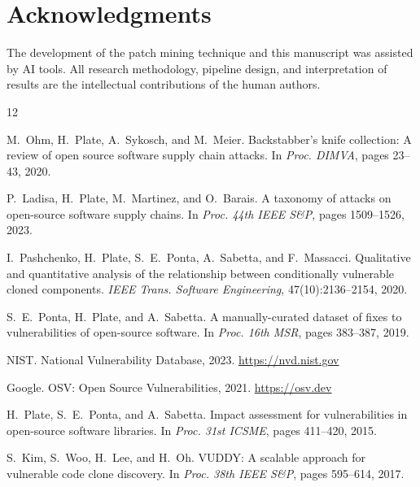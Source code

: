 \documentclass[sigconf,nonacm]{acmart}
\begin{document}
\section*{Acknowledgments}

The development of the patch mining technique and this manuscript was
assisted by AI tools. All research methodology, pipeline design, and
interpretation of results are the intellectual contributions of the
human authors.


\begin{thebibliography}{12}

M.~Ohm, H.~Plate, A.~Sykosch, and M.~Meier.
\newblock Backstabber's knife collection: A review of open source software 
supply chain attacks.
\newblock In \emph{Proc. DIMVA}, pages 23--43, 2020.

P.~Ladisa, H.~Plate, M.~Martinez, and O.~Barais.
\newblock A taxonomy of attacks on open-source software supply chains.
\newblock In \emph{Proc. 44th IEEE S\&P}, pages 1509--1526, 2023.

I.~Pashchenko, H.~Plate, S.~E.~Ponta, A.~Sabetta, and F.~Massacci.
\newblock Qualitative and quantitative analysis of the relationship between 
conditionally vulnerable cloned components.
\newblock \emph{IEEE Trans. Software Engineering}, 47(10):2136--2154, 2020.

S.~E.~Ponta, H.~Plate, and A.~Sabetta.
\newblock A manually-curated dataset of fixes to vulnerabilities of 
open-source software.
\newblock In \emph{Proc. 16th MSR}, pages 383--387, 2019.

NIST.
\newblock National Vulnerability Database, 2023.
\newblock \url{https://nvd.nist.gov}

Google.
\newblock OSV: Open Source Vulnerabilities, 2021.
\newblock \url{https://osv.dev}

H.~Plate, S.~E.~Ponta, and A.~Sabetta.
\newblock Impact assessment for vulnerabilities in open-source software 
libraries.
\newblock In \emph{Proc. 31st ICSME}, pages 411--420, 2015.

S.~Kim, S.~Woo, H.~Lee, and H.~Oh.
\newblock VUDDY: A scalable approach for vulnerable code clone discovery.
\newblock In \emph{Proc. 38th IEEE S\&P}, pages 595--614, 2017.


\end{thebibliography}
\end{document}
